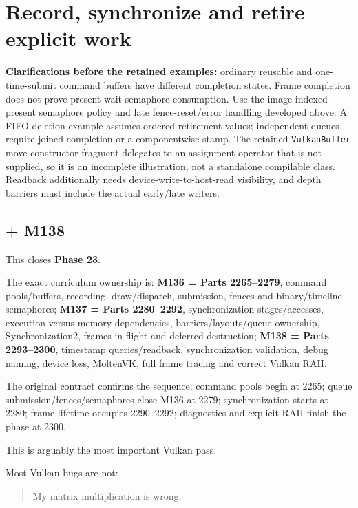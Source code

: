 \section{Record, synchronize and retire explicit work}\label{05-engine-i-ch021-record-synchronize-and-retire-explicit-work}

\textbf{Clarifications before the retained examples:} ordinary reusable and one-time-submit command buffers have different completion states. Frame completion does not prove present-wait semaphore consumption. Use the image-indexed present semaphore policy and late fence-reset/error handling developed above. A FIFO deletion example assumes ordered retirement values; independent queues require joined completion or a componentwise stamp. The retained \texttt{VulkanBuffer} move-constructor fragment delegates to an assignment operator that is not supplied, so it is an incomplete illustration, not a standalone compilable class. Readback additionally needs device-write-to-host-read visibility, and depth barriers must include the actual early/late writers.

\subsection{+ M138}\label{05-engine-i-ch021-m138}

This closes \textbf{Phase 23}.

The exact curriculum ownership is: \textbf{M136 = Parts 2265--2279}, command pools/buffers, recording, draw/dispatch, submission, fences and binary/timeline semaphores; \textbf{M137 = Parts 2280--2292}, synchronization stages/accesses, execution versus memory dependencies, barriers/layouts/queue ownership, Synchronization2, frames in flight and deferred destruction; \textbf{M138 = Parts 2293--2300}, timestamp queries/readback, synchronization validation, debug naming, device loss, MoltenVK, full frame tracing and correct Vulkan RAII.

The original contract confirms the sequence: command pools begin at 2265; queue submission/fences/semaphores close M136 at 2279; synchronization starts at 2280; frame lifetime occupies 2290--2292; diagnostics and explicit RAII finish the phase at 2300.

This is arguably the most important Vulkan pass.

Most Vulkan bugs are not:

\begin{quote}
My matrix multiplication is wrong.
\end{quote}

